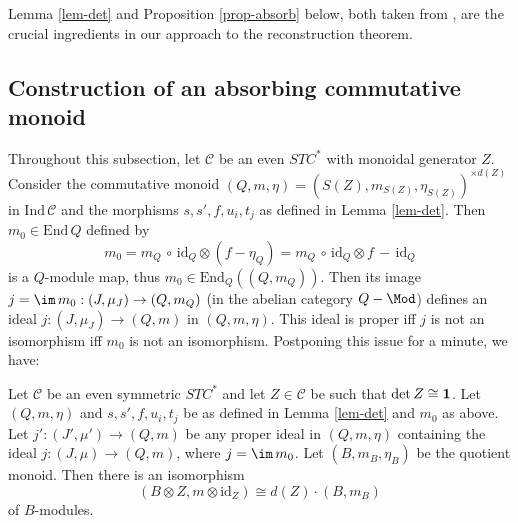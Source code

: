 \documentclass[11pt]{article}
\theoremstyle{definition}
\theoremstyle{definition}
\theoremstyle{remark}
\def\2#1{{\mathcal #1}}
\def\1#1{{\bf #1}}
\newcommand{\End}{\mathrm{End}}
\newcommand{\mcirc}{\,\circ\,}
\newcommand{\rarr}{\rightarrow}
\def\id{\mathrm{id}}
\begin{document}
\brem Lemma \ref{lem-det} and Proposition \ref{prop-absorb} below, both taken from \cite{bichon},
are the crucial ingredients in our approach to the reconstruction theorem.
\erem





\subsection{Construction of an absorbing commutative monoid} \label{ss-monoid2}
Throughout this subsection, let $\2C$ be an even $STC^*$ with monoidal generator $Z$. Consider the
commutative monoid $(Q,m,\eta)=(S(Z),m_{S(Z)},\eta_{S(Z)})^{\times d(Z)}$ in $\mathrm{Ind}\,\2C$ and
the morphisms $s,s',f,u_i,t_j$ as defined in Lemma \ref{lem-det}. Then $m_0\in\End\,Q$ defined by 
\[  m_0 = m_Q\mcirc\id_Q\otimes (f-\eta_Q)=m_Q\mcirc\id_Q\otimes f \,-\, \id_Q \]
is a $Q$-module map, thus $m_0\in\End_Q((Q,m_Q))$. Then its image 
$j=\im\,m_0:(J,\mu_J)\rarr(Q,m_Q)$ (in the abelian category $Q-\Mod$) defines 
an ideal $j:(J,\mu_J)\rarr(Q,m)$ in $(Q,m,\eta)$. This ideal is proper iff $j$ is not an
isomorphism iff $m_0$ is not an isomorphism. Postponing this issue for a minute, we have:

\bprop \label{prop-absorb} 
Let $\2C$ be an even symmetric $STC^*$ and let $Z\in\2C$ be such that $\det Z\cong\11$. Let
$(Q,m,\eta)$ and $s,s',f,u_i,t_j$ be as defined in Lemma \ref{lem-det} and $m_0$ as above. Let
$j':(J',\mu')\rarr(Q,m)$ be any proper ideal in $(Q,m,\eta)$ containing the ideal
$j:(J,\mu)\rarr(Q,m)$, where $j=\im\,m_0$. Let $(B,m_B,\eta_B)$ be the quotient monoid. Then
there is an  isomorphism 
\[ (B\otimes Z,m\otimes\id_Z)\cong d(Z)\cdot(B,m_B) \]
of $B$-modules. 
\eprop
\end{document}
